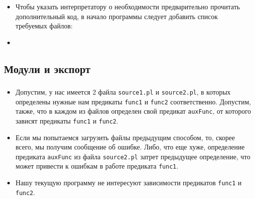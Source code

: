 \begin{frame}

	\frametitle{\insertsection}
	\framesubtitle{\insertsubsection}
	
	\begin{itemize}
		\item[] Чтобы указать интерпретатору о необходимости предварительно прочитать дополнительный код, в начало программы следует добавить список требуемых
		файлов:
		\item[]
	\end{itemize}
	
\end{frame}


\subsection{Модули и экспорт}

\begin{frame}

	\frametitle{\insertsection}
	\framesubtitle{\insertsubsection}
	
	\begin{itemize}
		\item Допустим, у нас имеется 2 файла \texttt{source1.pl} и \texttt{source2.pl}, в которых определены нужные нам предикаты \texttt{func1} и
		\texttt{func2} соответственно. Допустим, также, что в каждом из файлов определен свой предикат \texttt{auxFunc}, от которого зависят
		предикаты \texttt{func1} и \texttt{func2}.
		\item Если мы попытаемся загрузить файлы предыдущим способом, то, скорее всего, мы получим сообщение об ошибке. Либо, что еще хуже, определение
		предиката \texttt{auxFunc} из файла \texttt{source2.pl} затрет предыдущее определение, что может привести к ошибкам в работе предиката \texttt{func1}.
		\item Нашу текущую программу не интересуют зависимости предикатов \texttt{func1} и \texttt{func2}.
	\end{itemize}

\end{frame}


